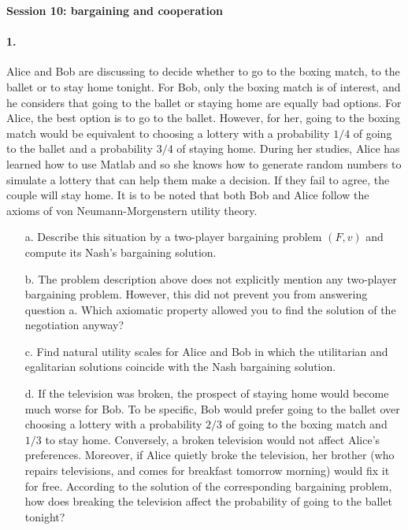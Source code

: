 \documentclass[a4paper,notitlepage,11pt]{article}
\begin{document}
\setlength{\parindent}{0pt}
\setlength{\parskip}{1ex plus 0.5ex minus 0.2ex}

\Large

\textbf{Session 10: bargaining and cooperation}


\paragraph{1. } Alice and Bob are discussing to decide whether to go to the boxing match, to the ballet or to stay home tonight. For Bob, only the boxing match is of interest, and he considers that going to the ballet or staying home are equally bad options. For Alice, the best option is to go to the ballet. However, for her, going to the boxing match would be equivalent to choosing a lottery with a probability $1/4$ of going to the ballet and a probability $3/4$ of staying home. During her studies, Alice has learned how to use Matlab and so she knows how to generate random numbers to simulate a lottery that can help them make a decision. If they fail to agree, the couple will stay home. It is to be noted that both Bob and Alice follow the axioms of von Neumann-Morgenstern utility theory.

\begin{enumerate}
	\item[a.] Describe this situation by a two-player bargaining problem $(F,v)$ and compute its Nash's bargaining solution.
	\item[b.] The problem description above does not explicitly mention any two-player bargaining problem. However, this did not prevent you from answering question a. Which axiomatic property allowed you to find the solution of the negotiation anyway?
	\item[c.] Find natural utility scales for Alice and Bob in which the utilitarian and egalitarian solutions coincide with the Nash bargaining solution.
	\item[d.] If the television was broken, the prospect of staying home would become much worse for Bob. To be specific, Bob would prefer going to the ballet over choosing a lottery with a probability $2/3$ of going to the boxing match and $1/3$ to stay home. Conversely, a broken television would not affect Alice's preferences. Moreover, if Alice quietly broke the television, her brother (who repairs televisions, and comes for breakfast tomorrow morning) would fix it for free. According to the solution of the corresponding bargaining problem, how does breaking the television affect the probability of going to the ballet tonight?
\end{enumerate}
\end{document}
